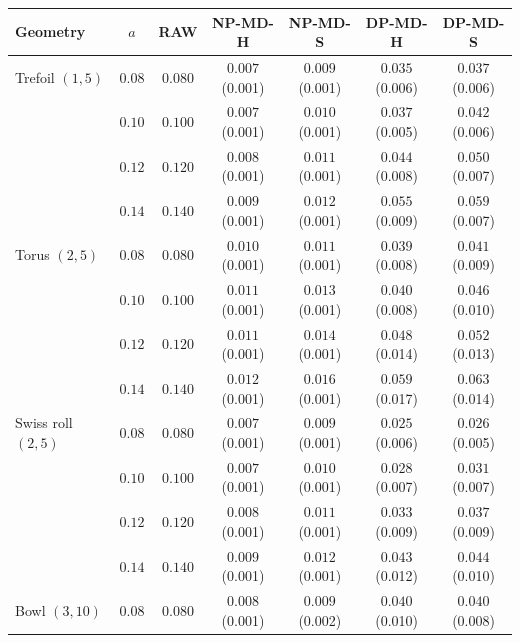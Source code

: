 \begin{tabular}{lcccccc}
\toprule
Geometry & $a$ & RAW & NP-MD-H & NP-MD-S & DP-MD-H & DP-MD-S \\
\midrule
Trefoil $(1,5)$ & $0.08$ & $0.080$ & $0.007$ \scriptsize(0.001) & $0.009$ \scriptsize(0.001) & $0.035$ \scriptsize(0.006) & $0.037$ \scriptsize(0.006) \\
 & $0.10$ & $0.100$ & $0.007$ \scriptsize(0.001) & $0.010$ \scriptsize(0.001) & $0.037$ \scriptsize(0.005) & $0.042$ \scriptsize(0.006) \\
 & $0.12$ & $0.120$ & $0.008$ \scriptsize(0.001) & $0.011$ \scriptsize(0.001) & $0.044$ \scriptsize(0.008) & $0.050$ \scriptsize(0.007) \\
 & $0.14$ & $0.140$ & $0.009$ \scriptsize(0.001) & $0.012$ \scriptsize(0.001) & $0.055$ \scriptsize(0.009) & $0.059$ \scriptsize(0.007) \\
\midrule
Torus $(2,5)$ & $0.08$ & $0.080$ & $0.010$ \scriptsize(0.001) & $0.011$ \scriptsize(0.001) & $0.039$ \scriptsize(0.008) & $0.041$ \scriptsize(0.009) \\
 & $0.10$ & $0.100$ & $0.011$ \scriptsize(0.001) & $0.013$ \scriptsize(0.001) & $0.040$ \scriptsize(0.008) & $0.046$ \scriptsize(0.010) \\
 & $0.12$ & $0.120$ & $0.011$ \scriptsize(0.001) & $0.014$ \scriptsize(0.001) & $0.048$ \scriptsize(0.014) & $0.052$ \scriptsize(0.013) \\
 & $0.14$ & $0.140$ & $0.012$ \scriptsize(0.001) & $0.016$ \scriptsize(0.001) & $0.059$ \scriptsize(0.017) & $0.063$ \scriptsize(0.014) \\
\midrule
Swiss roll $(2,5)$ & $0.08$ & $0.080$ & $0.007$ \scriptsize(0.001) & $0.009$ \scriptsize(0.001) & $0.025$ \scriptsize(0.006) & $0.026$ \scriptsize(0.005) \\
 & $0.10$ & $0.100$ & $0.007$ \scriptsize(0.001) & $0.010$ \scriptsize(0.001) & $0.028$ \scriptsize(0.007) & $0.031$ \scriptsize(0.007) \\
 & $0.12$ & $0.120$ & $0.008$ \scriptsize(0.001) & $0.011$ \scriptsize(0.001) & $0.033$ \scriptsize(0.009) & $0.037$ \scriptsize(0.009) \\
 & $0.14$ & $0.140$ & $0.009$ \scriptsize(0.001) & $0.012$ \scriptsize(0.001) & $0.043$ \scriptsize(0.012) & $0.044$ \scriptsize(0.010) \\
\midrule
Bowl $(3,10)$ & $0.08$ & $0.080$ & $0.008$ \scriptsize(0.001) & $0.009$ \scriptsize(0.002) & $0.040$ \scriptsize(0.010) & $0.040$ \scriptsize(0.008) \\

\end{tabular}

